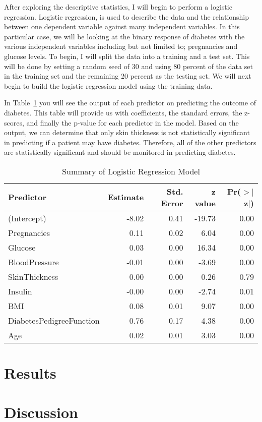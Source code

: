 \documentclass[12pt]{article}
\begin{document}
    After exploring the descriptive statistics, I will begin to perform a logistic regression. Logistic regression, is used to describe the data and the relationship between one dependent variable against many independent variables. In this particular case, we will be looking at the binary response of diabetes with the various independent variables including but not limited to; pregnancies and glucose levels. To begin, I will split the data into a training and a test set. This will be done by setting a random seed of 30 and using 80 percent of the data set in the training set and the remaining 20 percent as the testing set. We will next begin to build the logistic regression model using the training data. 
    
    In Table~\ref{tab:sl} you will see the output of each predictor on predicting the outcome of diabetes. This table will provide us with coefficients, the standard errors, the z-scores, and finally the p-value for each predictor in the model. Based on the output, we can determine that only skin thickness is not statistically significant in predicting if a patient may have diabetes. Therefore, all of the other predictors are statistically significant and should be monitored in predicting diabetes.



\begin{table}[ht]
    \caption{Summary of Logistic Regression Model}
    \label{tab:sl}
\centering
\begin{tabular}{lrrrr}
  \hline
Predictor & Estimate & Std. Error & z value & Pr($>$$|$z$|$) \\ 
  \hline
(Intercept) & -8.02 & 0.41 & -19.73 & 0.00 \\ 
  Pregnancies & 0.11 & 0.02 & 6.04 & 0.00 \\ 
  Glucose & 0.03 & 0.00 & 16.34 & 0.00 \\ 
  BloodPressure & -0.01 & 0.00 & -3.69 & 0.00 \\ 
  SkinThickness & 0.00 & 0.00 & 0.26 & 0.79 \\ 
  Insulin & -0.00 & 0.00 & -2.74 & 0.01 \\ 
  BMI & 0.08 & 0.01 & 9.07 & 0.00 \\ 
  DiabetesPedigreeFunction & 0.76 & 0.17 & 4.38 & 0.00 \\ 
  Age & 0.02 & 0.01 & 3.03 & 0.00 \\ 
   \hline
\end{tabular}
\end{table}
\section{Results}
\label{sec:resu}

\section{Discussion}
\label{sec:disc}



\end{document}
